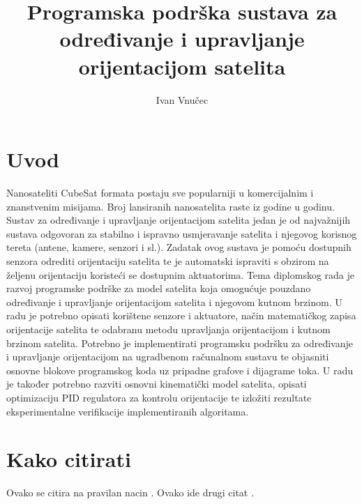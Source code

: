 \documentclass[times, utf8, diplomski]{templates/fer}
\begin{document}

\title{Programska podrška sustava za određivanje i upravljanje orijentacijom satelita}

\author{Ivan Vnučec}

\maketitle

\izvornik


\tableofcontents

\chapter{Uvod}
Nanosateliti CubeSat formata postaju sve popularniji u komercijalnim i znanstvenim misijama. Broj lansiranih nanosatelita raste iz godine u godinu. Sustav za određivanje i upravljanje orijentacijom satelita jedan je od najvažnijih sustava odgovoran za stabilno i ispravno usmjeravanje satelita i njegovog korisnog tereta (antene, kamere, senzori i sl.). Zadatak ovog sustava je pomoću dostupnih senzora odrediti orijentaciju satelita te je automatski ispraviti s obzirom na željenu orijentaciju koristeći se dostupnim aktuatorima. Tema diplomskog rada je razvoj programske podrške za model satelita koja omogućuje pouzdano određivanje i upravljanje orijentacijom satelita i njegovom kutnom brzinom. U radu je potrebno opisati korištene senzore i aktuatore, način matematičkog zapisa orijentacije satelita te odabranu metodu upravljanja orijentacijom i kutnom brzinom satelita. Potrebno je implementirati programsku podršku za određivanje i upravljanje orijentacijom na ugradbenom računalnom sustavu te objasniti osnovne blokove programskog koda uz pripadne grafove i dijagrame toka. U radu je također potrebno razviti osnovni kinematički model satelita, opisati optimizaciju PID regulatora za kontrolu orijentacije te izložiti rezultate eksperimentalne verifikacije implementiranih algoritama. 

\chapter{Kako citirati}
Ovako se citira na pravilan nacin \cite{oetiket2007lshort}. Ovako ide drugi citat \cite{ungar2002uvod}.
\end{document}
